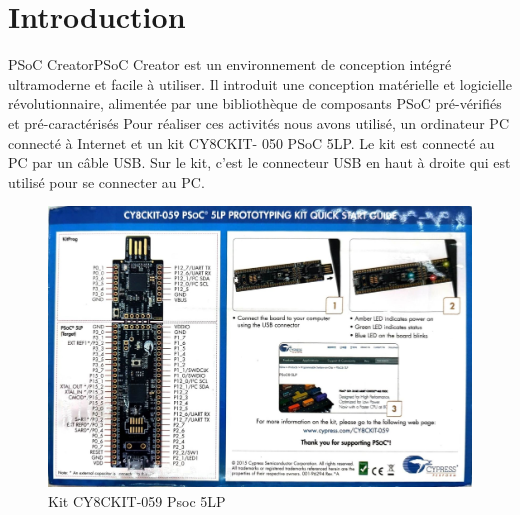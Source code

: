 \section*{Introduction}
PSoC CreatorPSoC Creator est un environnement de conception intégré 
ultramoderne et facile à utiliser. Il introduit une conception matérielle et 
logicielle révolutionnaire, alimentée par
 une bibliothèque de composants PSoC pré-vérifiés et pré-caractérisés
Pour réaliser ces activités nous avons utilisé, un ordinateur PC connecté à Internet et un kit CY8CKIT-
050 PSoC 5LP. Le kit est connecté au PC par un câble USB. Sur le kit, c’est le connecteur USB en haut à
droite qui est utilisé pour se connecter au PC.
\\
\begin{figure}[htp]
    \centering
    \includegraphics[width=1.1\textwidth]{images/Kit.jpg }
    \caption{Kit CY8CKIT-059 Psoc 5LP }
    \label{fig:example0}
\end{figure}


\vspace{.5cm}

\newpage

